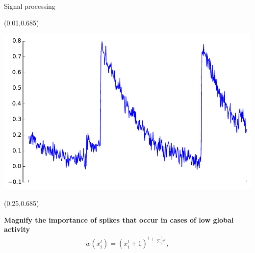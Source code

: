 \documentclass[final]{beamer}
\begin{document}
\begin{frame}{}
\begin{textblock}{0.485}
\begin{block}{Signal processing \phantom{p}}
\begin{textblock}{0.485}(0.01,0.685)
\begin{minipage}{0.48\linewidth}
\begin{shaded}
\begin{center}
\includegraphics[width=0.85\linewidth]{images/original_curve.pdf}
\end{center}
\vspace{-14pt}
\end{shaded}
\end{minipage}
\end{textblock}

\begin{textblock}{0.485}(0.25,0.685)
\begin{minipage}{0.48\linewidth}
\begin{shaded}
\vspace{15pt}
{\color{lightred} \textbf{Magnify the importance of spikes that occur in cases of low global activity}}
\begin{align*}
w(x^{t}_i) = (x^{t}_i + 1 )^{1 + \frac{1}{\sum_{j} x^{t}_j}},
\end{align*}\vspace{42pt}
\end{shaded}
\end{minipage}
\end{textblock}



\end{block}







\end{textblock}





 


\end{frame}
\end{document}
